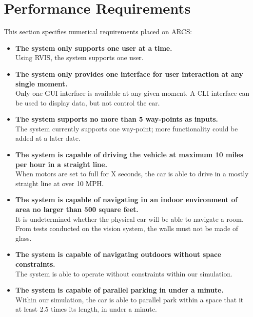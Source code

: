 \documentclass[compsoc,draftclsnofoot,onecolumn,10pt]{IEEEtran}
\begin{document}
\section{Performance Requirements}
This section specifies numerical requirements placed on ARCS:
\begin{itemize}
	\item \textbf{The system only supports one user at a time.}
	\\ Using RVIS, the system supports one user. 
	
	\item \textbf{The system only provides one interface for user interaction at any single moment.}
	\\ Only one GUI interface is available at any given moment. A CLI interface can be used to display data, but not control the car. 
	
	\item \textbf{The system supports no more than 5 way-points as inputs.}
	\\ The system currently supports one way-point; more functionality could be added at a later date. 
	
	\item \textbf{The system is capable of driving the vehicle at maximum 10 miles per hour in a straight line.}
	\\ When motors are set to full for X seconds, the car is able to drive in a mostly straight line at over 10 MPH.
	
	\item \textbf{The system is capable of navigating in an indoor environment of area no larger than 500 square feet.}
	\\ It is undetermined whether the physical car will be able to navigate a room. From tests conducted on the vision system, the walls must not be made of glass. 
	
	\item \textbf{The system is capable of navigating outdoors without space constraints.}
	\\ The system is able to operate without constraints within our simulation. 
	
	\item \textbf{The system is capable of parallel parking in under a minute. }
	\\ Within our simulation, the car is able to parallel park within a space that it at least 2.5 times its length, in under a minute. 
\end{itemize}
\end{document}
